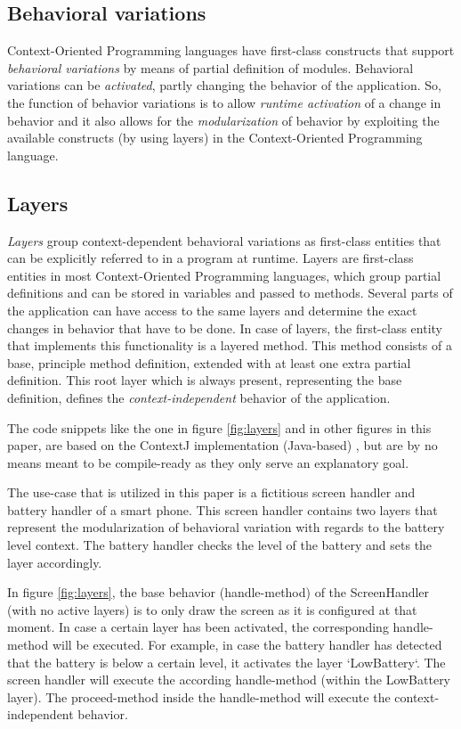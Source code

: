 \documentclass{acm_proc_article-sp}
\begin{document}
\subsection{Behavioral variations}
\label{sec:behavioral_variations}
Context-Oriented Programming languages have first-class constructs that support \textit{behavioral variations} by means of partial definition of modules. Behavioral variations can be \textit{activated}, partly changing the behavior of the application. So, the function of behavior variations is to allow \textit{runtime activation} of a change in behavior and it also allows for the \textit{modularization} of behavior by exploiting the available constructs (by using layers) in the Context-Oriented Programming language.    

\subsection{Layers}
\label{sec:layers}
\textit{Layers} group context-dependent behavioral variations as first-class entities that can be explicitly referred to in a program at runtime. Layers are first-class entities in most Context-Oriented Programming languages, which group partial definitions and can be stored in variables and passed to methods. Several parts of the application can have access to the same layers and determine the exact changes in behavior that have to be done. In case of layers, the first-class entity that implements this functionality is a layered method. This method consists of a base, principle method definition, extended with at least one extra partial definition. This root layer which is always present, representing the base definition, defines the \textit{context-independent} behavior of the application.

The code snippets like the one in figure \ref{fig:layers} and in other figures in this paper, are based on the ContextJ implementation (Java-based) \cite{Appeltauer:2009:IDC:1562112.1562117}, but are by no means meant to be compile-ready as they only serve an explanatory goal. 

The use-case that is utilized in this paper is a fictitious screen handler and battery handler of a smart phone. This screen handler contains two layers that represent the modularization of behavioral variation with regards to the battery level context. The battery handler checks the level of the battery and sets the layer accordingly.

In figure \ref{fig:layers}, the base behavior (handle-method) of the ScreenHandler (with no active layers) is to only draw the screen as it is configured at that moment. In case a certain layer has been activated, the corresponding handle-method will be executed. For example, in case the battery handler has detected that the battery is below a certain level, it activates the layer `LowBattery`. The screen handler will execute the according handle-method (within the LowBattery layer). The proceed-method inside the handle-method will execute the context-independent behavior.
 
\end{document}
